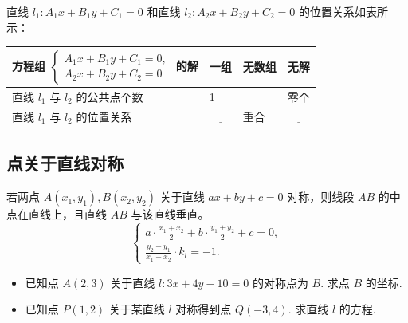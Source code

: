 \begin{example}
    直线 $l_1: A_1 x+B_1 y+C_1=0$ 和直线 $l_2: A_2 x+B_2 y+C_2=0$ 的位置关系如表所示：

    \begin{center}
        \begin{tabular}{|l|l|l|l|}
            \hline 方程组 $\left\{\begin{array}{l}A_1 x+B_1 y+C_1=0, \\ A_2 x+B_2 y+C_2=0\end{array}\right.$ 的解 & 一组                   & 无数组   & 无解                   \\
            \hline 直线 $l_1$ 与 $l_2$ 的公共点个数                                                                   & 1                    & \quad & 零个                   \\
            \hline 直线 $l_1$ 与 $l_2$ 的位置关系                                                                    & $\underline{\qquad}$ & 重合    & $\underline{\qquad}$ \\
            \hline
        \end{tabular}
    \end{center}
\end{example}

\subsection{点关于直线对称}

\begin{theorem}[点关于直线的对称]
    若两点 $A(x_1, y_1), B(x_2, y_2)$ 关于直线 $ax+by+c=0$ 对称，则线段 $AB$ 的中点在直线上，且直线 $AB$ 与该直线垂直。
    $$
        \begin{cases}
            a \cdot \frac{x_1+x_2}{2} + b \cdot \frac{y_1+y_2}{2} + c = 0, \\
            \frac{y_2-y_1}{x_1-x_2} \cdot k_l= -1.
        \end{cases}
    $$
\end{theorem}

\begin{example}
    \begin{itemize}
        \item[(1)] 已知点 $A(2,3)$ 关于直线 $l: 3x+4y-10=0$ 的对称点为 $B$. 求点 $B$ 的坐标.

        \item[(2)] 已知点 $P(1,2)$ 关于某直线 $l$ 对称得到点 $Q(-3,4)$. 求直线 $l$ 的方程.
    \end{itemize}
\end{example}

